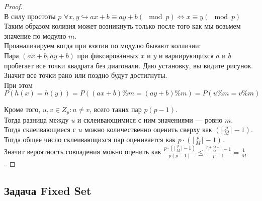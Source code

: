 \begin{proof} \ \\
    В силу простоты $p$ $\forall x, y \hookrightarrow ax + b \equiv ay + b (\mod p) \iff x \equiv y (\mod p)$\\
    Таким образом колизия может возникнуть только после того как мы возьмем значение по модулю $m$. \\

    Проанализируем когда при взятии по модулю бывают коллизии: \\ 
    Пара $(ax + b, ay + b)$ при фиксированных  $x$ и  $y$ и вариирующихся $a$ и  $b$ пробегает все точки квадрата без диагонали.
    Даю установку, вы видите рисунок.
    Значит все точки рано или поздно будут достигнуты. \\
    При этом $P(h(x) = h(y)) = P((ax + b) \% m = (ay + b) \% m) = P(u \% m = v \% m)$

    Кроме того, $u, v \in Z_p: u \neq v$, всего таких пар $p(p - 1)$. \\
    Тогда разница между  $u$  и склеивающимися с ним значениями --- ровно $m$. \\
    Тогда склеивающиеся с $u$  можно количественно оценить сверху как $(\lceil \frac{p}{M} \rceil - 1) $. \\
    Тогда общее число склеивающихся пар оценивается как $p \cdot (\lceil \frac{p}{M} \rceil - 1)$. \\
    Значит вероятность совпадения можно оценить как $\frac{p \cdot (\lceil \frac{p}{M} \rceil - 1)}{p(p - 1)}  \leq \frac{\frac{p + M - 1}{M} - 1}{p - 1} = \frac{1}{M}$.
\end{proof}

\subsection{Задача Fixed Set}

